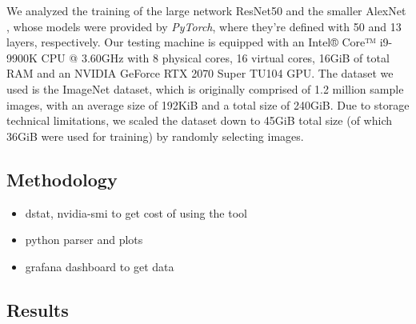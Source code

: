 \documentclass[conference]{IEEEtran}
\begin{document}
We analyzed the training of the large network ResNet50 \cite{resnet50} and the smaller AlexNet \cite{alexnet}, whose models were
provided by \textit{PyTorch}, where they're defined with 50 and 13 layers, respectively. Our testing machine is equipped with an Intel® Core™ i9-9900K CPU @ 3.60GHz with
8 physical cores, 16 virtual cores, 16GiB of total RAM and an NVIDIA GeForce RTX 2070 Super TU104 GPU. The dataset we used is the ImageNet \cite{imagenet} dataset, which is originally comprised of 1.2 million sample images, with an average size of 192KiB and a total size of 240GiB. Due to storage technical limitations, we scaled the dataset down to 45GiB total size (of which 36GiB were used for training) by randomly selecting images.

\subsection{Methodology}

\begin{itemize}
	\item dstat, nvidia-smi to get cost of using the tool
	\item python parser and plots
	\item grafana dashboard to get data
\end{itemize}

\subsection{Results}
\end{document}
